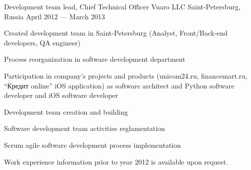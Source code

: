 \begin{cventries}
  \cventry
    {Development team lead, Chief Technical Officer} %
    {Vuaro LLC} %
    {Saint-Petersburg, Russia} %
    {April 2012 --- March 2013} %
    {
      \begin{cvitems} %
        \item {Created development team in Saint-Petersburg (Analyst, Front/Back-end developers, QA engineer)}
        \item {Process reorganization in software development department}
        \item {Participation in company’s projects and products (unicom24.ru,
financemart.ru, “Кредит online” iOS application) as software architect and
Python software developer and iOS software developer}
        \item {Development team creation and building}
        \item {Software development team activities reglamentation}
        \item {Scrum agile software development process implementation}
      \end{cvitems}
    }

    Work experience information prior to year 2012 is available upon request.

\end{cventries}
